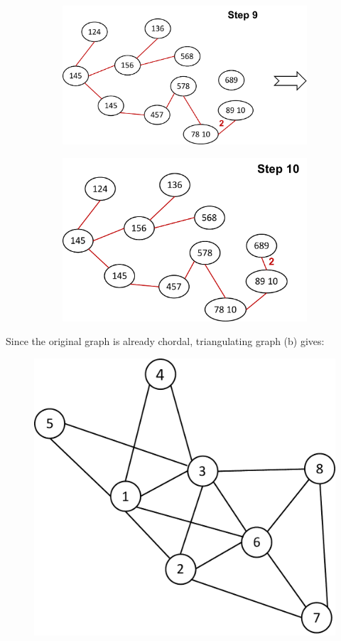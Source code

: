 \documentclass{article}
\begin{document}
\begin{figure}[h]
\begin{subfigure}[b]{0.315\textwidth}
  \end{subfigure}
  \hspace{0.1cm}
    \begin{subfigure}[b]{0.315\textwidth}
  	\centering
  	\includegraphics[width=\columnwidth]{3a11.pdf}
  \end{subfigure}
  \hspace{0.1cm}
    \begin{subfigure}[b]{0.27\textwidth}
  	\centering
  	\includegraphics[width=\columnwidth]{3a12.pdf}
  \end{subfigure}
\end{figure}
\pagebreak

Since the original graph is already chordal, triangulating graph (b) gives:
\begin{figure}[h]
  \centering
  \includegraphics[width=0.25\columnwidth]{3b0.pdf}
    \vspace{-0.1cm}
\end{figure}
\end{document}

